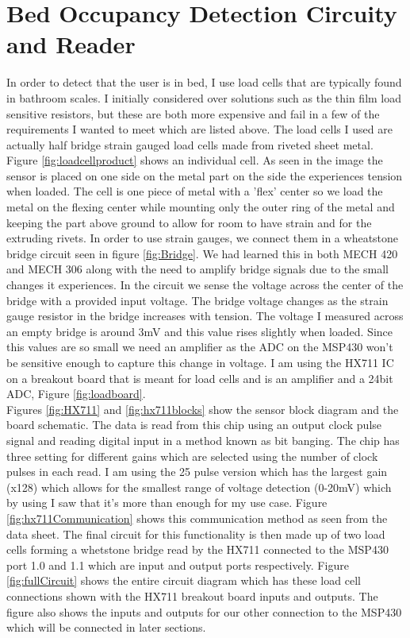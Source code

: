 \documentclass[11pt]{article}
\begin{document}
\section{Bed Occupancy Detection Circuity and Reader}
In order to detect that the user is in bed, I use load cells that are typically found in bathroom scales. 
I initially considered over solutions such as the thin film load sensitive resistors, but these are both more expensive and fail in a few of the requirements I wanted to meet which are listed above. 
The load cells I used are actually half bridge strain gauged load cells made from riveted sheet metal. 
Figure \ref{fig:loadcellproduct} shows an individual cell.
As seen in the image the sensor is placed on one side on the metal part on the side the experiences tension when loaded.
The cell is one piece of metal with a 'flex' center so we load the metal on the flexing center while mounting only the outer ring of the metal and keeping the part above ground to allow for room to have strain and for the extruding rivets.
In order to use strain gauges, we connect them in a wheatstone bridge circuit seen in figure \ref{fig:Bridge}.
We had learned this in both MECH 420 and MECH 306 along with the need to amplify bridge signals due to the small changes it experiences.
In the circuit we sense the voltage across the center of the bridge with a provided input voltage. 
The bridge voltage changes as the strain gauge resistor in the bridge increases with tension. 
The voltage I measured across an empty bridge is around 3mV and this value rises slightly when loaded. 
Since this values are so small we need an amplifier as the ADC on the MSP430 won't be sensitive enough to capture this change in voltage.
I am using the HX711 IC on a breakout board that is meant for load cells and is an amplifier and a 24bit ADC, Figure \ref{fig:loadboard}. \\

Figures \ref{fig:HX711} and \ref{fig:hx711blocks} show the sensor block diagram and the board schematic.
The data is read from this chip using an output clock pulse signal and reading digital input in a method known as bit banging.  
The chip has three setting for different gains which are selected using the number of clock pulses in each read. 
I am using the 25 pulse version which has the largest gain (x128) which allows for the smallest range of voltage detection (0-20mV) which by using I saw that it's more than enough for my use case.
Figure \ref{fig:hx711Communication} shows this communication method as seen from the data sheet.
The final circuit for this functionality is then made up of two load cells forming a whetstone bridge read by the HX711 connected to the MSP430 port 1.0 and 1.1 which are input and output ports respectively.
Figure \ref{fig:fullCircuit} shows the entire circuit diagram which has these load cell connections shown with the HX711 breakout board inputs and outputs.
The figure also shows the inputs and outputs for our other connection to the MSP430 which will be connected in later sections.\\
\end{document}
